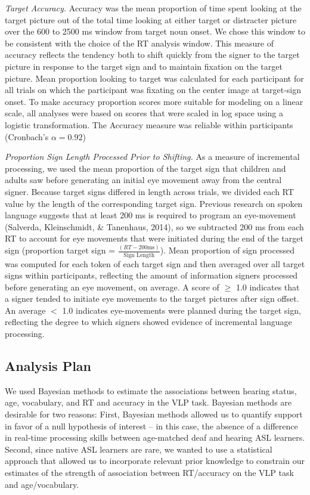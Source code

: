 \documentclass[oneside]{report}
\begin{document}
\emph{Target Accuracy.} Accuracy was the mean proportion of time spent
looking at the target picture out of the total time looking at either
target or distracter picture over the 600 to 2500 ms window from target
noun onset. We chose this window to be consistent with the choice of the
RT analysis window. This measure of accuracy reflects the tendency both
to shift quickly from the signer to the target picture in response to
the target sign and to maintain fixation on the target picture. Mean
proportion looking to target was calculated for each participant for all
trials on which the participant was fixating on the center image at
target-sign onset. To make accuracy proportion scores more suitable for
modeling on a linear scale, all analyses were based on scores that were
scaled in log space using a logistic transformation. The Accuracy
measure was reliable within participants (Cronbach's \(\alpha = 0.92\))

\emph{Proportion Sign Length Processed Prior to Shifting.} As a measure
of incremental processing, we used the mean proportion of the target
sign that children and adults saw before generating an initial eye
movement away from the central signer. Because target signs differed in
length across trials, we divided each RT value by the length of the
corresponding target sign. Previous research on spoken language suggests
that at least 200 ms is required to program an eye-movement (Salverda,
Kleinschmidt, \& Tanenhaus, 2014), so we subtracted 200 ms from each RT
to account for eye movements that were initiated during the end of the
target sign (proportion target sign =
\(\frac{(RT-200 \text{ms})}{\text{Sign Length}}\)). Mean proportion of
sign processed was computed for each token of each target sign and then
averaged over all target signs within participants, reflecting the
amount of information signers processed before generating an eye
movement, on average. A score of \(\geq\) 1.0 indicates that a signer
tended to initiate eye movements to the target pictures after sign
offset. An average \(<\) 1.0 indicates eye-movements were planned during
the target sign, reflecting the degree to which signers showed evidence
of incremental language processing.

\subsection{Analysis Plan}\label{analysis-plan}

We used Bayesian methods to estimate the associations between hearing
status, age, vocabulary, and RT and accuracy in the VLP task. Bayesian
methods are desirable for two reasons: First, Bayesian methods allowed
us to quantify support in favor of a null hypothesis of interest -- in
this case, the absence of a difference in real-time processing skills
between age-matched deaf and hearing ASL learners. Second, since native
ASL learners are rare, we wanted to use a statistical approach that
allowed us to incorporate relevant prior knowledge to constrain our
estimates of the strength of association between RT/accuracy on the VLP
task and age/vocabulary.
\end{document}
